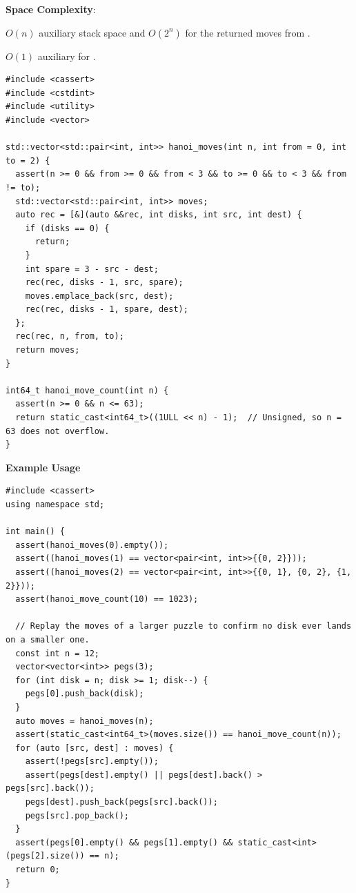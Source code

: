 \textbf{Space Complexity}:
\begin{compactitem}
  \item $O(n)$ auxiliary stack space and $O(2^{n})$ for the returned moves from .
  \item $O(1)$ auxiliary for .
\end{compactitem}

\begin{lstlisting}[style=cpp]
#include <cassert>
#include <cstdint>
#include <utility>
#include <vector>

std::vector<std::pair<int, int>> hanoi_moves(int n, int from = 0, int to = 2) {
  assert(n >= 0 && from >= 0 && from < 3 && to >= 0 && to < 3 && from != to);
  std::vector<std::pair<int, int>> moves;
  auto rec = [&](auto &&rec, int disks, int src, int dest) {
    if (disks == 0) {
      return;
    }
    int spare = 3 - src - dest;
    rec(rec, disks - 1, src, spare);
    moves.emplace_back(src, dest);
    rec(rec, disks - 1, spare, dest);
  };
  rec(rec, n, from, to);
  return moves;
}

int64_t hanoi_move_count(int n) {
  assert(n >= 0 && n <= 63);
  return static_cast<int64_t>((1ULL << n) - 1);  // Unsigned, so n = 63 does not overflow.
}
\end{lstlisting}
\textbf{Example Usage}\par
\begin{lstlisting}[style=cpp]
#include <cassert>
using namespace std;

int main() {
  assert(hanoi_moves(0).empty());
  assert((hanoi_moves(1) == vector<pair<int, int>>{{0, 2}}));
  assert((hanoi_moves(2) == vector<pair<int, int>>{{0, 1}, {0, 2}, {1, 2}}));
  assert(hanoi_move_count(10) == 1023);

  // Replay the moves of a larger puzzle to confirm no disk ever lands on a smaller one.
  const int n = 12;
  vector<vector<int>> pegs(3);
  for (int disk = n; disk >= 1; disk--) {
    pegs[0].push_back(disk);
  }
  auto moves = hanoi_moves(n);
  assert(static_cast<int64_t>(moves.size()) == hanoi_move_count(n));
  for (auto [src, dest] : moves) {
    assert(!pegs[src].empty());
    assert(pegs[dest].empty() || pegs[dest].back() > pegs[src].back());
    pegs[dest].push_back(pegs[src].back());
    pegs[src].pop_back();
  }
  assert(pegs[0].empty() && pegs[1].empty() && static_cast<int>(pegs[2].size()) == n);
  return 0;
}
\end{lstlisting}
